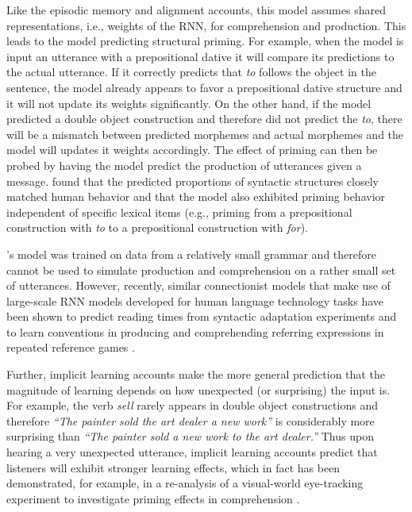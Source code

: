 Like the episodic memory and alignment accounts, this model assumes shared representations, i.e., weights of the RNN, for comprehension and production.
This leads to the model predicting structural priming. For example, when the model is input an utterance with a prepositional dative it will compare its predictions
to the actual utterance. If it correctly predicts that \textit{to} follows the object in the sentence, the model already appears to favor a prepositional dative structure and it will
not update its weights significantly. On the other hand, if the model predicted a double object construction and therefore did not predict the \textit{to}, there will be a mismatch
between predicted morphemes and actual morphemes and the model will updates it weights accordingly. The effect of priming can then be probed by having the model predict
the production of utterances given a message. \cite{Cheng2006} found that the predicted proportions of syntactic structures closely matched human behavior and that the model
also exhibited priming behavior independent of specific lexical items (e.g., priming from a prepositional construction with \textit{to} to a prepositional construction with \textit{for}).

\cite{Cheng2006}'s model was trained on data from a relatively small grammar and therefore cannot be used to simulate production and comprehension on a rather small set
of utterances. However, recently, similar connectionist models that make use of large-scale RNN models developed for human language technology 
tasks have been shown to predict reading times from syntactic adaptation experiments \cite{vanSchijndelLinzen2018} and to learn conventions in producing and comprehending 
referring expressions in repeated reference games \cite{Hawkins2019}. 

Further, implicit learning accounts make the more general prediction that the magnitude of learning depends on how unexpected (or surprising) the input is. For example, the verb \textit{sell} 
rarely appears in  double object constructions and therefore \textit{``The painter sold the art dealer a new work''} is considerably more surprising than \textit{``The painter sold  a new work to 
the art dealer.''} Thus upon hearing a very unexpected utterance, implicit learning accounts predict that listeners will exhibit stronger learning effects, which in fact has been demonstrated, 
for example, in a re-analysis of a visual-world eye-tracking experiment to investigate priming effects in comprehension \cite{ThothathiriSnedeker2008,SniderJaeger2013}. 

